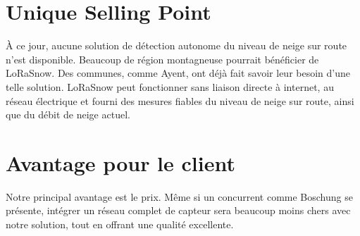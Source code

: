 \section{Unique Selling Point}
À ce jour, aucune solution de détection autonome du niveau de neige sur route
n'est disponible. Beaucoup de région montagneuse pourrait bénéficier 
de LoRaSnow. Des communes, comme Ayent, ont déjà fait savoir leur besoin
d'une telle solution.
LoRaSnow peut fonctionner sans liaison directe à internet, au réseau électrique
et fourni des mesures fiables du niveau de neige sur route, ainsi que du débit de
neige actuel.

\section{Avantage pour le client}
Notre principal avantage est le prix. Même si un concurrent comme Boschung se présente,
intégrer un réseau complet de capteur sera beaucoup moins chers avec notre
solution, tout en offrant une qualité excellente.